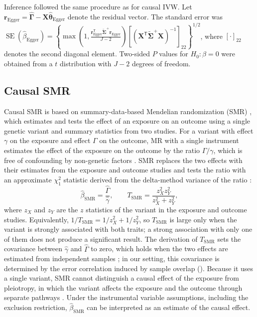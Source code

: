 \noindent Inference followed the same procedure as for causal IVW. Let $\boldsymbol{r}_{\mathrm{Egger}}=\hat{\boldsymbol{\Gamma}}-\boldsymbol{X}\hat{\boldsymbol{\theta}}_{\text{Egger}}$ denote the residual vector. The standard error was $\operatorname{SE}(\hat{\beta}_{\text{Egger}})=\left\{\max\left(1,\frac{\boldsymbol{r}_{\mathrm{Egger}}^{\mathsf T}\widetilde{\boldsymbol{\Sigma}}^{+}\boldsymbol{r}_{\mathrm{Egger}}}{J-2}\right)\left[\left(\boldsymbol{X}^{\mathsf T}\widetilde{\boldsymbol{\Sigma}}^{+}\boldsymbol{X}\right)^{-1}\right]_{22}\right\}^{1/2}$, where $[\cdot]_{22}$ denotes the second diagonal element. Two-sided $P$ values for $H_0:\beta=0$ were obtained from a $t$ distribution with $J-2$ degrees of freedom.


\subsection{Causal SMR}
\label{sec:smr}

Causal SMR is based on summary-data-based Mendelian randomization (SMR) \cite{zhu2016smr}, which estimates and tests the effect of an exposure on an outcome using a single genetic variant and summary statistics from two studies. For a variant with effect $\gamma$ on the exposure and effect $\Gamma$ on the outcome, MR with a single instrument estimates the effect of the exposure on the outcome by the ratio $\Gamma/\gamma$, which is free of confounding by non-genetic factors \cite{zhu2016smr}. SMR replaces the two effects with their estimates from the exposure and outcome studies and tests the ratio with an approximate $\chi^2_1$ statistic derived from the delta-method variance of the ratio \cite{zhu2016smr}:
\begin{equation*}
\hat{\beta}_{\mathrm{SMR}}=\frac{\hat{\Gamma}}{\hat{\gamma}},
\qquad
T_{\mathrm{SMR}}=\frac{z_X^2z_Y^2}{z_X^2+z_Y^2},
\end{equation*}
where $z_X$ and $z_Y$ are the $z$ statistics of the variant in the exposure and outcome studies. Equivalently, $1/T_{\mathrm{SMR}}=1/z_X^2+1/z_Y^2$, so $T_{\mathrm{SMR}}$ is large only when the variant is strongly associated with both traits; a strong association with only one of them does not produce a significant result. The derivation of $T_{\mathrm{SMR}}$ sets the covariance between $\hat{\gamma}$ and $\hat{\Gamma}$ to zero, which holds when the two effects are estimated from independent samples \cite{zhu2016smr}; in our setting, this covariance is determined by the error correlation induced by sample overlap (). Because it uses a single variant, SMR cannot distinguish a causal effect of the exposure from pleiotropy, in which the variant affects the exposure and the outcome through separate pathways \cite{zhu2016smr}. Under the instrumental variable assumptions, including the exclusion restriction, $\hat{\beta}_{\mathrm{SMR}}$ can be interpreted as an estimate of the causal effect.

